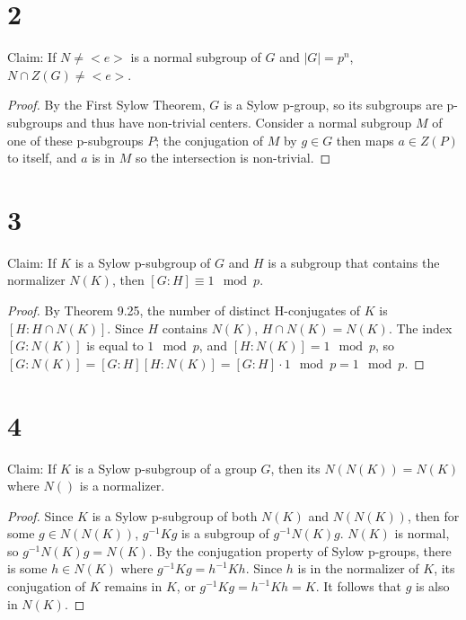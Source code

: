 \documentclass{article}
\begin{document}
\section*{2}

Claim: If $N \neq <e>$ is a normal subgroup of $G$ and $|G| = p^n$, $N \cap Z(G) \neq <e>$.

\begin{proof}
    By the First Sylow Theorem, $G$ is a Sylow p-group, so its subgroups are p-subgroups and 
    thus have non-trivial centers.  Consider a normal subgroup $M$ of one of these p-subgroups $P$;
    the conjugation of $M$ by $g \in G$ then maps $a \in Z(P)$ to itself, and $a$ is in $M$ 
    so the intersection is non-trivial.
\end{proof}

\section*{3}

Claim: If $K$ is a Sylow p-subgroup of $G$ and $H$ is a subgroup that contains the 
normalizer $N(K)$, then $[G:H] \equiv 1 \mod p$.

\begin{proof}
    By Theorem 9.25, the number of distinct H-conjugates of $K$ is $[H:H \cap N(K)]$.  
    Since $H$ contains $N(K)$, $H \cap N(K) = N(K)$.  The index $[G:N(K)]$ is equal to 
    $1 \mod p$, and $[H:N(K)] = 1 \mod p$, so $[G:N(K)] = [G:H][H:N(K)] = [G:H] \cdot 1 \mod p =
    1 \mod p$.  

\end{proof}


\section*{4}

Claim: If $K$ is a Sylow p-subgroup of a group $G$, then its $N(N(K)) = N(K)$ where 
$N()$ is a normalizer.

\begin{proof}
    Since $K$ is a Sylow p-subgroup of both $N(K)$ and $N(N(K))$, then for some 
    $g \in N(N(K))$, $g^{-1}Kg$ is a subgroup of $g^{-1}N(K)g$.  $N(K)$ is normal, so 
    $g^{-1}N(K)g = N(K)$.  By the conjugation property of Sylow p-groups, there is some 
    $h \in N(K)$ where $g^{-1}Kg = h^{-1}Kh$.  Since $h$ is in the normalizer of $K$, its 
    conjugation of $K$ remains in $K$, or $g^{-1}Kg = h^{-1}Kh = K$.  It follows that 
    $g$ is also in $N(K)$.
\end{proof}
\end{document}
